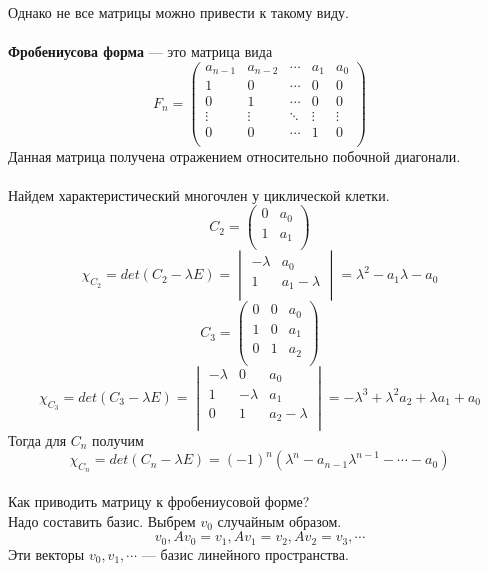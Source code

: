 \documentclass[12pt]{article}
\theoremstyle{definition}
\numberwithin{equation}{section}
\begin{document}
	Однако не все матрицы можно привести к такому виду.\\ \\
	\textbf{Фробениусова форма} --- это матрица вида
	\[F_n=\begin{pmatrix}
	a_{n-1} & a_{n-2} & \cdots & a_1 & a_0 \\
	1 & 0 & \cdots & 0 & 0 \\
	0 & 1 & \cdots & 0 & 0 \\
	\vdots & \vdots & \ddots & \vdots & \vdots \\
	0 & 0 & \cdots & 1 & 0 \\
	\end{pmatrix}\]
	Данная матрица получена отражением относительно побочной диагонали.\\
	\\
	Найдем характеристический многочлен у циклической клетки.\\
	\[C_2=\begin{pmatrix}
	0 & a_0 \\
	1 & a_1 \\
	\end{pmatrix}\]
	\[\chi_{C_2}= det(C_2-\lambda E)=\begin{vmatrix}
	-\lambda & a_0 \\
	1 & a_1-\lambda \\
	\end{vmatrix}=\lambda^2-a_1\lambda-a_0\]
	\[C_3=\begin{pmatrix}
	0 & 0 & a_0 \\
	1 &  0 & a_1 \\
	0 & 1 & a_2 \\
	\end{pmatrix}\]
	\[\chi_{C_3}= det(C_3-\lambda E)=\begin{vmatrix}
	-\lambda & 0 & a_0 \\
	1 & -\lambda & a_1\\
	0 & 1 & a_2-\lambda \\
	\end{vmatrix}=-\lambda^3+\lambda^2a_2+\lambda a_1+a_0\]
	Тогда для $C_n$ получим
	$$\chi_{C_n}=det(C_n-\lambda E)=(-1)^n(\lambda^n-a_{n-1}\lambda^{n-1}-\cdots-a_0)$$
	\\
	Как приводить матрицу к фробениусовой форме?\\
	Надо составить базис. Выбрем $v_0$ случайным образом.\\
	$$v_0, Av_0=v_1, Av_1=v_2, Av_2=v_3,\cdots$$
	Эти векторы $v_0, v_1,\cdots$ --- базис линейного пространства.\\
\end{document}
